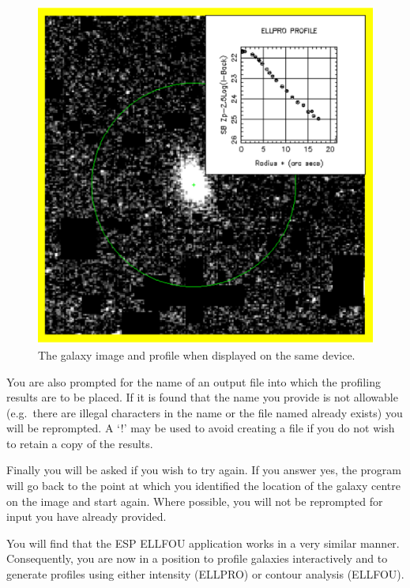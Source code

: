 \documentclass[twoside,11pt]{article}
\begin{document}
\begin{htmlonly}
\begin{figure}[htlb]
\centering
\includegraphics{sun180_diag3}
\caption{The galaxy image and profile when displayed on the same device.}
\end{figure}
\end{htmlonly}

You are also prompted for the name of an output file into which the
profiling results are to be placed. If it is found that the name you provide is
not allowable (e.g.\ there are illegal characters in the name or the file named
already exists) you will be reprompted. A `!' may be used to avoid creating a
file if you do not wish to retain a copy of the results.

Finally you will be asked if you wish to try again. If you answer yes, the
program will go back to the point at which you identified the location of the
galaxy centre on the image and start again. Where possible, you will not be
reprompted for input you have already provided.

You will find that the ESP ELLFOU application works in a very similar manner.
Consequently, you are now in a position to profile galaxies
interactively and to generate profiles using either intensity (ELLPRO) or
contour analysis (ELLFOU).
\end{document}
